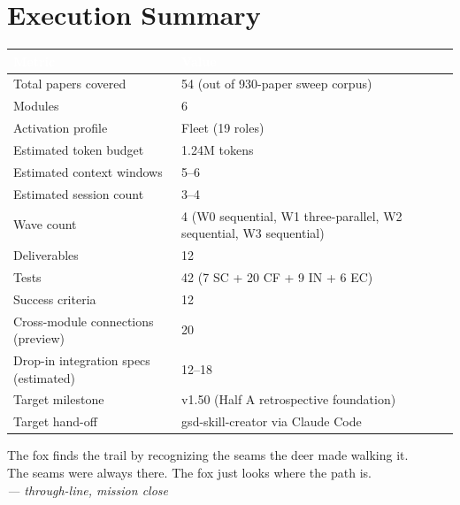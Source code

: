 \documentclass[11pt,letterpaper]{article}
\newcommand{\tableheader}[1]{\textbf{\sffamily\textcolor{white}{#1}}}
\begin{document}
\section{Execution Summary}

\begin{center}
\begin{tabularx}{\textwidth}{L{4cm}X}
\toprule
{}
\tableheader{Metric} & \tableheader{Value} \\
\midrule
Total papers covered & 54 (out of 930-paper sweep corpus) \\
Modules & 6 \\
Activation profile & Fleet (19 roles) \\
Estimated token budget & 1.24M tokens \\
Estimated context windows & 5--6 \\
Estimated session count & 3--4 \\
Wave count & 4 (W0 sequential, W1 three-parallel, W2 sequential, W3 sequential) \\
Deliverables & 12 \\
Tests & 42 (7 SC + 20 CF + 9 IN + 6 EC) \\
Success criteria & 12 \\
Cross-module connections (preview) & 20 \\
Drop-in integration specs (estimated) & 12--18 \\
Target milestone & v1.50 (Half A retrospective foundation) \\
Target hand-off & gsd-skill-creator via Claude Code \\
\bottomrule
\end{tabularx}
\end{center}

\vspace{1em}
\begin{quotebox}
\centering\sffamily
The fox finds the trail by recognizing the seams the deer made walking it.\\
The seams were always there. The fox just looks where the path is.\\[0.5em]
\textit{--- through-line, mission close}
\end{quotebox}



\clearpage
\appendix
\end{document}
